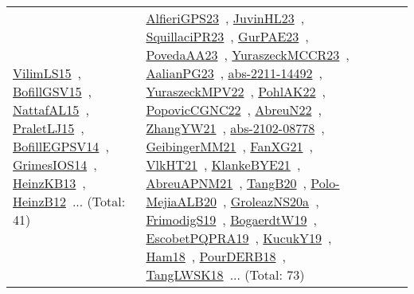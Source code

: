 {\begin{longtable}{lp{3cm}>{\raggedright\arraybackslash}p{6cm}>{\raggedright\arraybackslash}p{6cm}>{\raggedright\arraybackslash}p{8cm}}
\href{works/VilimLS15.pdf}{VilimLS15}~\cite{VilimLS15}, \href{works/BofillGSV15.pdf}{BofillGSV15}~\cite{BofillGSV15}, \href{works/NattafAL15.pdf}{NattafAL15}~\cite{NattafAL15}, \href{works/PraletLJ15.pdf}{PraletLJ15}~\cite{PraletLJ15}, \href{works/BofillEGPSV14.pdf}{BofillEGPSV14}~\cite{BofillEGPSV14}, \href{works/GrimesIOS14.pdf}{GrimesIOS14}~\cite{GrimesIOS14}, \href{works/HeinzKB13.pdf}{HeinzKB13}~\cite{HeinzKB13}, \href{works/HeinzB12.pdf}{HeinzB12}~\cite{HeinzB12}... (Total: 41) & \href{works/AlfieriGPS23.pdf}{AlfieriGPS23}~\cite{AlfieriGPS23}, \href{works/JuvinHL23.pdf}{JuvinHL23}~\cite{JuvinHL23}, \href{works/SquillaciPR23.pdf}{SquillaciPR23}~\cite{SquillaciPR23}, \href{works/GurPAE23.pdf}{GurPAE23}~\cite{GurPAE23}, \href{works/PovedaAA23.pdf}{PovedaAA23}~\cite{PovedaAA23}, \href{works/YuraszeckMCCR23.pdf}{YuraszeckMCCR23}~\cite{YuraszeckMCCR23}, \href{works/AalianPG23.pdf}{AalianPG23}~\cite{AalianPG23}, \href{works/abs-2211-14492.pdf}{abs-2211-14492}~\cite{abs-2211-14492}, \href{works/YuraszeckMPV22.pdf}{YuraszeckMPV22}~\cite{YuraszeckMPV22}, \href{works/PohlAK22.pdf}{PohlAK22}~\cite{PohlAK22}, \href{works/PopovicCGNC22.pdf}{PopovicCGNC22}~\cite{PopovicCGNC22}, \href{works/AbreuN22.pdf}{AbreuN22}~\cite{AbreuN22}, \href{works/ZhangYW21.pdf}{ZhangYW21}~\cite{ZhangYW21}, \href{works/abs-2102-08778.pdf}{abs-2102-08778}~\cite{abs-2102-08778}, \href{works/GeibingerMM21.pdf}{GeibingerMM21}~\cite{GeibingerMM21}, \href{works/FanXG21.pdf}{FanXG21}~\cite{FanXG21}, \href{works/VlkHT21.pdf}{VlkHT21}~\cite{VlkHT21}, \href{works/KlankeBYE21.pdf}{KlankeBYE21}~\cite{KlankeBYE21}, \href{works/AbreuAPNM21.pdf}{AbreuAPNM21}~\cite{AbreuAPNM21}, \href{works/TangB20.pdf}{TangB20}~\cite{TangB20}, \href{works/Polo-MejiaALB20.pdf}{Polo-MejiaALB20}~\cite{Polo-MejiaALB20}, \href{works/GroleazNS20a.pdf}{GroleazNS20a}~\cite{GroleazNS20a}, \href{works/FrimodigS19.pdf}{FrimodigS19}~\cite{FrimodigS19}, \href{works/BogaerdtW19.pdf}{BogaerdtW19}~\cite{BogaerdtW19}, \href{works/EscobetPQPRA19.pdf}{EscobetPQPRA19}~\cite{EscobetPQPRA19}, \href{works/KucukY19.pdf}{KucukY19}~\cite{KucukY19}, \href{works/Ham18.pdf}{Ham18}~\cite{Ham18}, \href{works/PourDERB18.pdf}{PourDERB18}~\cite{PourDERB18}, \href{works/TangLWSK18.pdf}{TangLWSK18}~\cite{TangLWSK18}... (Total: 73)\\

\end{longtable}}

